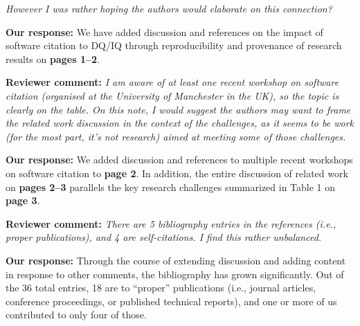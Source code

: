 \documentclass{article}
\begin{document}
\emph{However I was rather hoping the authors would elaborate on this connection?}

\textbf{Our response:}
We have added discussion and references on the impact of software citation to DQ\slash IQ through reproducibility and provenance of research results on \textbf{pages 1--2}.


\textbf{Reviewer comment:}
\emph{I am aware of at least one recent workshop on software citation (organised at the University of Manchester in the UK), so the topic is clearly on the table. On this note, I would suggest the authors may want to frame the related work discussion in the context of the challenges, as it seems to be work (for the most part, it's not research) aimed at meeting some of those challenges.}

\textbf{Our response:}
We added discussion and references to multiple recent workshops on software citation to \textbf{page 2}.
In addition, the entire discussion of related work on \textbf{pages 2--3} parallels the key research challenges summarized in Table 1 on \textbf{page 3}.


\textbf{Reviewer comment:}
\emph{There are 5 bibliography entries in the references (i.e., proper publications), and 4 are self-citations. I find this rather unbalanced.}

\textbf{Our response:}
Through the course of extending discussion and adding content in response to other comments, the bibliography has grown significantly.
Out of the 36 total entries, 18 are to ``proper'' publications (i.e., journal articles, conference proceedings, or published technical reports), and one or more of us contributed to only four of those.
\end{document}
